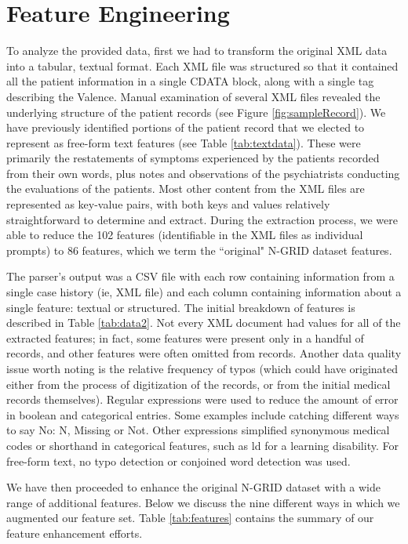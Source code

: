 \chapter{Feature Engineering}\label{sec:features}

To analyze the provided data, first we had to transform the original XML data into a tabular, textual format. Each XML file was structured so that it contained all the patient information in a single CDATA block, along with a single tag describing the Valence. Manual examination of several XML files revealed the underlying structure of the patient records (see Figure \ref{fig:sampleRecord}).  
We have previously identified portions of the patient record that we elected
to represent as free-form text features (see Table \ref{tab:textdata}). 
These were primarily the restatements of  symptoms experienced
by the patients recorded from
their own words, plus notes and observations of the psychiatrists conducting the
evaluations of the patients.  Most other content from the XML files 
are represented as key-value pairs, with both keys and values relatively straightforward
to determine and extract. During the extraction process, we were able to reduce the 102
features (identifiable in the XML files as individual prompts) to 86 features, which
we term the ``original" N-GRID dataset features.

The parser's output 
 was a CSV file with each row containing information from a single case 
 history (ie, XML file) and each column containing information about a single feature: textual or
 structured. The initial breakdown of features is described in Table \ref{tab:data2}.  Not every
 XML document had values for all of the extracted features; in fact, some features were
 present only in a handful of records, and other features were often omitted from records. Another data quality issue worth noting is the relative frequency of typos (which could have originated either from the process of digitization of the records, or from the initial medical records themselves). Regular expressions were used to reduce the amount of error in boolean and categorical entries. Some examples include catching different ways to say \textsf{No}: \textsf{N}, \textsf{Missing} or  \textsf{Not}. Other expressions simplified synonymous medical codes or shorthand in categorical features, such as \textsf{ld} for a \textsf{learning disability}. For free-form text, no typo detection or conjoined word detection was used. 
 

We have then proceeded to enhance the original N-GRID dataset with a wide range
of additional features. Below we discuss the nine different ways in which we augmented our feature set. Table \ref{tab:features} contains the summary of our feature
enhancement efforts.

